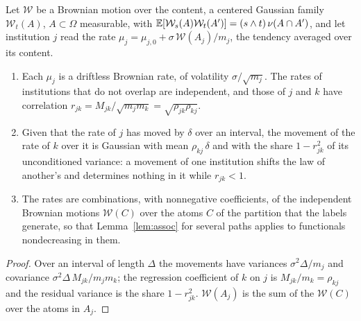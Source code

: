 \begin{proposition}\label{prop:readings}
Let $\mathcal W$ be a Brownian motion over the content, a centered
Gaussian family $\mathcal W_t(A)$, $A\subset\Omega$ measurable, with
$\mathbb{E}[\mathcal W_s(A)\mathcal W_t(A')]=(s\wedge t)\,\nu(A\cap A')$, and let
institution $j$ read the rate $\mu_j=\mu_{j,0}+\sigma\,\mathcal W(A_j)/m_j$,
the tendency averaged over its content.
\begin{enumerate}[label=\emph{(\roman*)},itemsep=1pt]
\item Each $\mu_j$ is a driftless Brownian rate, of volatility
$\sigma/\sqrt{m_j}$. The rates of institutions that do not overlap are
independent, and those of $j$ and $k$ have correlation
$r_{jk}=M_{jk}/\sqrt{m_jm_k}=\sqrt{\rho_{jk}\rho_{kj}}$.
\item Given that the rate of $j$ has moved by $\delta$ over an interval,
the movement of the rate of $k$ over it is Gaussian with mean
$\rho_{kj}\,\delta$ and with the share $1-r_{jk}^2$ of its unconditioned
variance: a movement of one institution shifts the law of another's and
determines nothing in it while $r_{jk}<1$.
\item The rates are combinations, with nonnegative coefficients, of the
independent Brownian motions $\mathcal W(C)$ over the atoms $C$ of the
partition that the labels generate, so that Lemma~\ref{lem:assoc} for
several paths applies to functionals nondecreasing in them.
\end{enumerate}
\end{proposition}

\begin{proof}
Over an interval of length $\Delta$ the movements have variances
$\sigma^2\Delta/m_j$ and covariance $\sigma^2\Delta\,M_{jk}/m_jm_k$; the
regression coefficient of $k$ on $j$ is $M_{jk}/m_k=\rho_{kj}$ and the
residual variance is the share $1-r_{jk}^2$. $\mathcal W(A_j)$ is the sum
of the $\mathcal W(C)$ over the atoms in $A_j$.
\end{proof}

